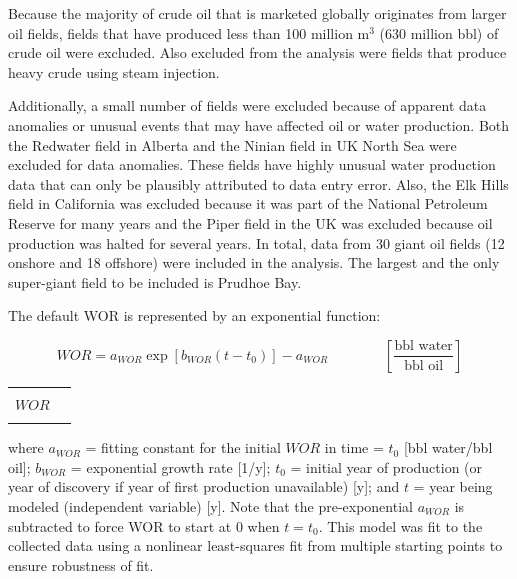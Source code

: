 \documentclass[11pt]{report}
\newcommand{\xlname}[1]{\raisebox{1pt}{\fcolorbox{light-gray}{light-gray}{\texttt{\textcolor{stanford}{\scriptsize{#1}}}}}}
\newcommand{\eqnunitfrac}[2]{\quad\quad \scriptstyle{\left[\frac{\text{#1}}{\text{#2}}\right]}}
\begin{document}
Because the majority of crude oil that is marketed globally originates from larger oil fields, fields that have produced less than 100 million m$^3$ (630 million bbl) of crude oil were excluded. Also excluded from the analysis were fields that produce heavy crude using steam injection. 

Additionally, a small number of fields were excluded because of apparent data anomalies or unusual events that may have affected oil or water production. Both the Redwater field in Alberta and the Ninian field in UK North Sea were excluded for data anomalies. These fields have highly unusual water production data that can only be plausibly attributed to data entry error. Also, the Elk Hills field in California was excluded because it was part of the National Petroleum Reserve for many years and the Piper field in the UK was excluded because oil production was halted for several years. In total, data from 30 giant oil fields (12 onshore and 18 offshore) were included in the analysis. The largest and the only super-giant field to be included is Prudhoe Bay.


The default WOR is represented by an exponential function:

\begin{minipage}{0.8\columnwidth}\label{eq:smart_default_WOR}
\begin{fleqn}[0pt]
\begin{equation}
WOR = a_{WOR} \exp [b_{WOR} ( t - t_0 )] - a_{WOR} \quad\quad\eqnunitfrac{bbl water}{bbl oil}
\end{equation}
\end{fleqn}
\end{minipage}\hfill
\begin{minipage}{0.3\columnwidth}
        \begin{tabular}{|cl}
        & \\
        $WOR$   & \xlname{WOR}\\
        & \\
\end{tabular}
\end{minipage}
where $a_{WOR}$ = fitting constant for the initial $WOR$ in time = $t_0$ [bbl water/bbl oil]; $b_{WOR}$ = exponential growth rate [1/y]; $t_0$ = initial year of production (or year of discovery if year of first production unavailable) [y]; and $t$ = year being modeled (independent variable) [y]. Note that the pre-exponential $a_{WOR}$ is subtracted to force WOR to start at 0 when $t = t_0$. This model was fit to the collected data using a nonlinear least-squares fit from multiple starting points to ensure robustness of fit.
\end{document}
